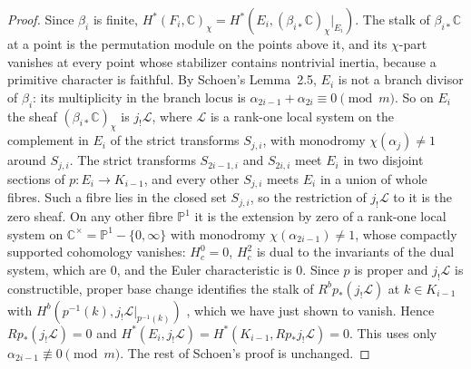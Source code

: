 \documentclass[11pt]{amsart}
\theoremstyle{definition}
\theoremstyle{remark}
\newcommand{\C}{\mathbb C}
\newcommand{\PP}{\mathbb P}
\begin{document}
\begin{proof}
Since $\beta_i$ is finite, $H^*(F_i,\C)_\chi=H^*(E_i,(\beta_{i*}\C)_\chi|_{E_i})$. The stalk of $\beta_{i*}\C$ at a point is the permutation module on the points above it, and its $\chi$-part vanishes at every point whose stabilizer contains nontrivial inertia, because a primitive character is faithful. By Schoen's Lemma~2.5, $E_i$ is not a branch divisor of $\beta_i$: its multiplicity in the branch locus is $\alpha_{2i-1}+\alpha_{2i}\equiv0\pmod m$. So on $E_i$ the sheaf $(\beta_{i*}\C)_\chi$ is $j_!\mathcal L$, where $\mathcal L$ is a rank-one local system on the complement in $E_i$ of the strict transforms $S_{j,i}$, with monodromy $\chi(\alpha_j)\ne1$ around $S_{j,i}$. The strict transforms $S_{2i-1,i}$ and $S_{2i,i}$ meet $E_i$ in two disjoint sections of $p\colon E_i\to K_{i-1}$, and every other $S_{j,i}$ meets $E_i$ in a union of whole fibres. Such a fibre lies in the closed set $S_{j,i}$, so the restriction of $j_!\mathcal L$ to it is the zero sheaf. On any other fibre $\PP^1$ it is the extension by zero of a rank-one local system on $\C^\times=\PP^1-\{0,\infty\}$ with monodromy $\chi(\alpha_{2i-1})\ne1$, whose compactly supported cohomology vanishes: $H^0_c=0$, $H^2_c$ is dual to the invariants of the dual system, which are $0$, and the Euler characteristic is $0$. Since $p$ is proper and $j_!\mathcal L$ is constructible, proper base change identifies the stalk of $R^bp_*(j_!\mathcal L)$ at $k\in K_{i-1}$ with $H^b(p^{-1}(k),j_!\mathcal L|_{p^{-1}(k)})$ \cite[Theorem~11.3.6]{Schapira}, which we have just shown to vanish. Hence $Rp_*(j_!\mathcal L)=0$ and $H^*(E_i,j_!\mathcal L)=H^*(K_{i-1},Rp_*j_!\mathcal L)=0$. This uses only $\alpha_{2i-1}\not\equiv0\pmod m$. The rest of Schoen's proof is unchanged.
\end{proof}
\end{document}
